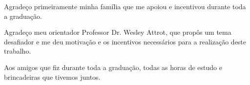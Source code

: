 \begin{agradecimentos}
        Agradeço primeiramente minha família que me apoiou e incentivou durante 
toda a graduação.
        
Agradeço meu orientador Professor Dr. Wesley Attrot, que propôs um tema
desafiador e me deu motivação e os incentivos necessários para a realização
deste trabalho.

Aos amigos que fiz durante toda a graduação, todas as horas de estudo
e brincadeiras que tivemos juntos.

\end{agradecimentos}

